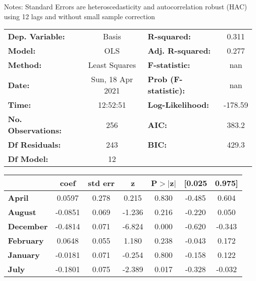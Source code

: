 Notes: \newline
 [1] Standard Errors are heteroscedasticity and autocorrelation robust (HAC) using 12 lags and without small sample correction
\begin{center}
\begin{tabular}{lclc}
\toprule
\textbf{Dep. Variable:}    &      Basis       & \textbf{  R-squared:         } &     0.311   \\
\textbf{Model:}            &       OLS        & \textbf{  Adj. R-squared:    } &     0.277   \\
\textbf{Method:}           &  Least Squares   & \textbf{  F-statistic:       } &       nan   \\
\textbf{Date:}             & Sun, 18 Apr 2021 & \textbf{  Prob (F-statistic):} &      nan    \\
\textbf{Time:}             &     12:52:51     & \textbf{  Log-Likelihood:    } &   -178.59   \\
\textbf{No. Observations:} &         256      & \textbf{  AIC:               } &     383.2   \\
\textbf{Df Residuals:}     &         243      & \textbf{  BIC:               } &     429.3   \\
\textbf{Df Model:}         &          12      & \textbf{                     } &             \\
\bottomrule
\end{tabular}
\begin{tabular}{lcccccc}
                   & \textbf{coef} & \textbf{std err} & \textbf{z} & \textbf{P$> |$z$|$} & \textbf{[0.025} & \textbf{0.975]}  \\
\midrule
\textbf{April}     &       0.0597  &        0.278     &     0.215  &         0.830        &       -0.485    &        0.604     \\
\textbf{August}    &      -0.0851  &        0.069     &    -1.236  &         0.216        &       -0.220    &        0.050     \\
\textbf{December}  &      -0.4814  &        0.071     &    -6.824  &         0.000        &       -0.620    &       -0.343     \\
\textbf{February}  &       0.0648  &        0.055     &     1.180  &         0.238        &       -0.043    &        0.172     \\
\textbf{January}   &      -0.0181  &        0.071     &    -0.254  &         0.800        &       -0.158    &        0.122     \\
\textbf{July}      &      -0.1801  &        0.075     &    -2.389  &         0.017        &       -0.328    &       -0.032     \\

\end{tabular}
\end{center}
